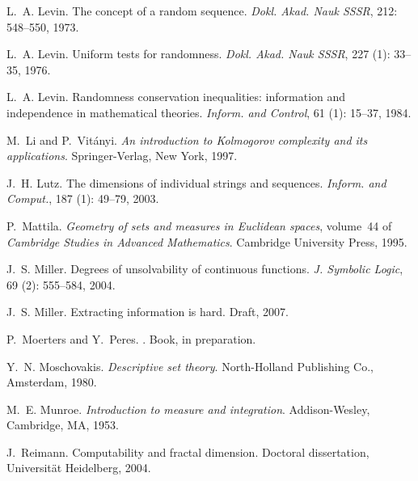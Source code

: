 \documentclass[11pt,reqno]{article}
\theoremstyle{plain}
\theoremstyle{definition}
\theoremstyle{remark}
\numberwithin{equation}{section}
\begin{document}
\begin{thebibliography}{41}
L.~A. Levin.
\newblock The concept of a random sequence.
\newblock \emph{Dokl. Akad. Nauk SSSR}, 212: 548--550, 1973.

L.~A. Levin.
\newblock Uniform tests for randomness.
\newblock \emph{Dokl. Akad. Nauk SSSR}, 227 (1): 33--35,
  1976.

L.~A. Levin.
\newblock Randomness conservation inequalities: information and independence in
  mathematical theories.
\newblock \emph{Inform. and Control}, 61 (1): 15--37, 1984.

M.~Li and P.~Vit{\'a}nyi.
\newblock \emph{An introduction to {K}olmogorov complexity and its
  applications}.
\newblock Springer-Verlag, New York, 1997.

J.~H. Lutz.
\newblock The dimensions of individual strings and sequences.
\newblock \emph{Inform. and Comput.}, 187 (1): 49--79, 2003.

P.~Mattila.
\newblock \emph{Geometry of sets and measures in {E}uclidean spaces}, volume~44
  of \emph{Cambridge Studies in Advanced Mathematics}.
\newblock Cambridge University Press, 1995.

J.~S. Miller.
\newblock Degrees of unsolvability of continuous functions.
\newblock \emph{J. Symbolic Logic}, 69 (2): 555--584, 2004.

J.~S. Miller.
\newblock Extracting information is hard.
\newblock Draft, 2007.

P.~Moerters and Y.~Peres.
.
\newblock Book, in preparation.

Y.~N. Moschovakis.
\newblock \emph{Descriptive set theory}.
\newblock North-Holland Publishing Co., Amsterdam, 1980.

M.~E. Munroe.
\newblock \emph{Introduction to measure and integration}.
\newblock Addison-Wesley, Cambridge, MA, 1953.

J.~Reimann.
\newblock Computability and fractal dimension.
\newblock Doctoral dissertation, Universit{\"a}t {H}eidelberg, 2004.


\end{thebibliography}
\end{document}
